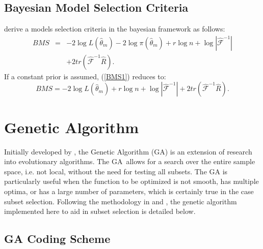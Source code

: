 \subsection{Bayesian Model Selection Criteria}

\citet{Bozd:Ueno:2000} derive a models selection criteria in the
bayesian framework as follows:
\begin{eqnarray}
BMS & = & -2\log L\left(\hat{\theta}_{m}\right)-2\log\pi\left(\hat{\theta}_{m}\right)+r\log n+\log\left\vert \hat{\mathcal{F}}^{-1}\right\vert \nonumber \\
 &  & +2tr\left(\hat{\mathcal{F}}^{-1}\hat{R}\right).\label{BMS1}
\end{eqnarray}
If a constant prior is assumed, (\ref{BMS1}) reduces to:
\[
BMS=-2\log L\left(\hat{\theta}_{m}\right)+r\log n+\log\left\vert \hat{\mathcal{F}}^{-1}\right\vert +2tr\left(\hat{\mathcal{F}}^{-1}\hat{R}\right).
\]



\section{Genetic Algorithm}

Initially developed by \citet{Holland:1975}, the Genetic Algorithm
(GA) is an extension of research into evolutionary algorithms. The
GA\ allows for a search over the entire sample space, i.e. not local,
without the need for testing all subsets. The GA is particularly useful
when the function to be optimized is not smooth, has multiple optima,
or has a large number of parameters, which is certainly true in the
case subset selection. Following the methodology in \citet{Bea:Boz:1998,Bea:Boz:2000}
and \citet{Bozd:2003}, the genetic algorithm implemented here to
aid in subset selection is detailed below.


\subsection{GA Coding Scheme}

